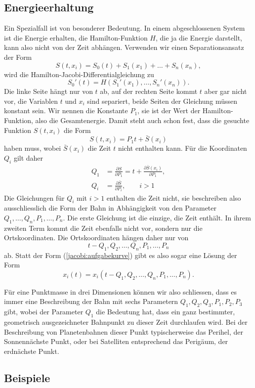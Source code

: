 \subsection{Energieerhaltung}
Ein Spezialfall ist von besonderer Bedeutung. In einem abgeschlossenen
System ist die Energie erhalten, die Hamilton-Funktion $H$, die ja
die Energie darstellt, kann also nicht von der Zeit abhängen.
Verwenden wir einen Separationsansatz der Form 
\[
S(t,x_i)=S_0(t)+S_1(x_1)+\dots+S_n(x_n),
\]
wird die Hamilton-Jacobi-Differentialgleichung zu
\[
S_0'(t)=H(S_1'(x_1),\dots, S_n'(x_n)).
\]
Die linke Seite hängt nur von $t$ ab, auf der rechten Seite
kommt $t$ aber gar nicht vor, die Variablen $t$ und $x_i$ sind
separiert, beide Seiten der Gleichung müssen konstant sein.
Wir nennen die Konstante $P_1$, sie ist der Wert der Hamilton-Funktion,
also die Gesamtenergie.
Damit steht auch schon fest, dass die gesuchte Funktion $S(t, x_i)$
die Form
\[
S(t,x_i)=P_1t + \bar S(x_i)
\]
haben muss, wobei $\bar S(x_i)$ die Zeit $t$ nicht enthalten kann.
Für die Koordinaten $Q_i$ gilt daher
\begin{align*}
Q_1&=\frac{\partial S}{\partial P_1}=t+\frac{\partial \bar S(x_i)}{\partial P_1},
\\
Q_i&=\frac{\partial \bar S}{\partial P_i},\qquad i>1
\end{align*}
Die Gleichungen für $Q_i$ mit $i>1$ enthalten die Zeit nicht, sie
beschreiben also ausschliesslich die Form der Bahn in Abhängigkeit
von den Parameter $Q_1,\dots,Q_n,P_1,\dots,P_n$. Die erste
Gleichung ist die einzige, die Zeit enthält. In ihrem zweiten
Term kommt die Zeit ebenfalls nicht vor, sondern nur die Ortskoordinaten.
Die Ortskoordinaten hängen daher nur von
\[
t-Q_1,Q_2,\dots,Q_n, P_1,\dots,P_n
\]
ab. Statt der Form (\ref{jacobi:aufgabekurve}) gibt es also sogar eine
Lösung der Form
\[
x_i(t)=x_i(t-Q_1,Q_2, \dots,Q_n,P_1,\dots,P_n).
\]

Für eine Punktmasse in drei Dimensionen können wir also schliessen, 
dass es immer eine Beschreibung der Bahn mit sechs Parametern
$Q_1,Q_2,Q_3,P_1,P_2,P_3$ gibt, wobei der Parameter $Q_1$ die Bedeutung
hat, dass ein ganz bestimmter, geometrisch ausgezeichneter Bahnpunkt
zu dieser Zeit durchlaufen wird.
Bei der Beschreibung von Planetenbahnen dieser Punkt typischerweise
das Perihel, der Sonnennächste Punkt, oder bei Satelliten entsprechend
das Perigäum, der erdnächste Punkt.

\subsection{Beispiele}
